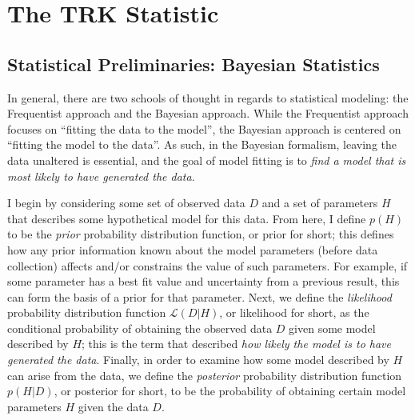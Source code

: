 \chapter{The TRK Statistic}
\label{cha:TRK}

\section{Statistical Preliminaries: Bayesian Statistics}
\label{sec:bayes}
In general, there are two schools of thought in regards to statistical modeling: the Frequentist approach and the Bayesian approach. While the Frequentist approach focuses on ``fitting the data to the model'', the Bayesian approach is centered on ``fitting the model to the data''. As such, in the Bayesian formalism, leaving the data unaltered is essential, and the goal of model fitting is to \textit{find a model that is most likely to have generated the data.} 

I begin by considering some set of observed data $D$ and a set of parameters $H$ that describes some hypothetical model for this data. From here, I define $p(H)$ to be the \textit{prior} probability distribution function, or prior for short; this defines how any prior information known about the model parameters (before data collection) affects and/or constrains the value of such parameters. For example, if some parameter has a best fit value and uncertainty from a previous result, this can form the basis of a prior for that parameter. Next, we define the \textit{likelihood} probability distribution function $\mathcal{L}(D|H)$, or likelihood for short, as the conditional probability of obtaining the observed data $D$ given some model described by $H$; this is the term that described \textit{how likely the model is to have generated the data}. Finally, in order to examine how some model described by $H$ can arise from the data, we define the \textit{posterior} probability distribution function $p(H|D)$, or posterior for short, to be the probability of obtaining certain model parameters $H$ given the data $D$.

